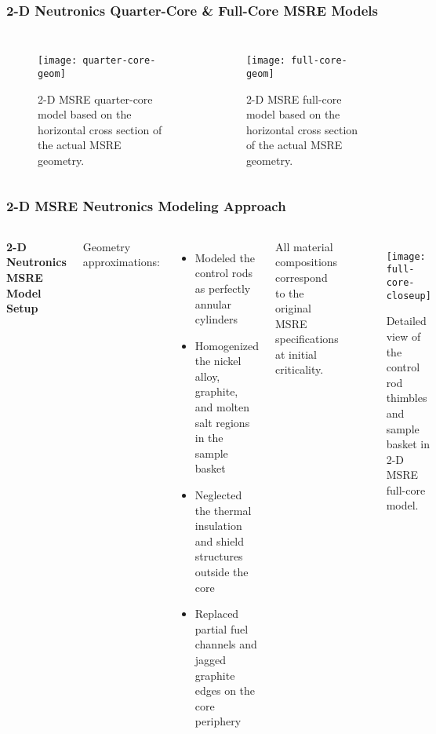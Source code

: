 \begin{frame}
  \frametitle{2-D Neutronics Quarter-Core \& Full-Core MSRE Models}
  \begin{columns}
    \column{5.5cm}
  \begin{figure}[htb!]
    \centering
    \texttt{[image: quarter-core-geom]}
    \caption{2-D \gls{MSRE} quarter-core model based on the horizontal cross section of the actual
    \gls{MSRE} geometry.}
    \label{fig:1/4-geom}
  \end{figure}
  \column{5.5cm}
  \begin{figure}[htb!]
    \centering
    \texttt{[image: full-core-geom]}
    \caption{2-D \gls{MSRE} full-core model based on the horizontal cross section of the actual
    \gls{MSRE} geometry.}
    \label{fig:full-geom}
  \end{figure}
\end{columns}
\end{frame}

\begin{frame}
  \frametitle{2-D MSRE Neutronics Modeling Approach}
  \begin{columns}
    \column{6.5cm}
    \textbf{2-D Neutronics MSRE Model Setup}
    \vspace{.2cm}

    Geometry approximations:
    \begin{itemize}
      \item Modeled the control rods as perfectly annular cylinders
      \item Homogenized the nickel alloy, graphite, and molten salt regions in the sample basket
      \item Neglected the thermal insulation and shield structures outside the core
      \item Replaced partial fuel channels and jagged graphite edges on the core periphery
    \end{itemize}
    All material compositions correspond to the original MSRE specifications at initial criticality.
    \column{4.5cm}
    \begin{figure}[htb!]
      \centering
      \texttt{[image: full-core-closeup]}
      \caption{Detailed view of the control rod thimbles and sample basket in 2-D \gls{MSRE} full-core
        model.}
      \label{fig:full-geom-closeup}
    \end{figure}
  \end{columns}
\end{frame}

